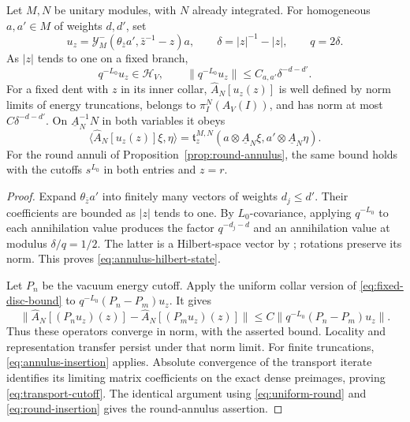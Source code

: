 \begin{lemma}\label{lem:transport-cutoff}
Let $M,N$ be unitary modules, with $N$ already integrated.  For
homogeneous $a,a'\in M$ of weights $d,d'$, set
\[
 u_z=\mathcal Y_M^-(\theta_{\bar z}a',\bar z^{-1}-z)a,
 \qquad \delta=|z|^{-1}-|z|,\qquad q=2\delta.
\]
As $|z|$ tends to one on a fixed branch,
\begin{equation}\label{eq:annulus-hilbert-state}
 q^{-L_0}u_z\in\mathcal H_V,
 \qquad \|q^{-L_0}u_z\|\leq C_{a,a'}\delta^{-d-d'}.
\end{equation}
For a fixed dent with $z$ in its inner collar,
$\widehat A_N[u_z(z)]$ is well defined by norm limits of energy
truncations, belongs to $\pi_I^N(A_V(I))$, and has norm at most
$C\delta^{-d-d'}$.  On $\underline A_N^{-1}N$ in both variables it obeys
\begin{equation}\label{eq:transport-cutoff}
 \langle\widehat A_N[u_z(z)]\xi,\eta\rangle
 =\mathfrak t_z^{M,N}
   (a\otimes\underline A_N\xi,
    a'\otimes\underline A_N\eta).
\end{equation}
For the round annuli of Proposition~\ref{prop:round-annulus}, the same
bound holds with the cutoffs $s^{L_0}$ in both entries and $z=r$.
\end{lemma}

\begin{proof}
Expand $\theta_{\bar z}a'$ into finitely many vectors of weights
$d_j\leq d'$.  Their coefficients are bounded as $|z|$ tends to one.
By $L_0$-covariance, applying $q^{-L_0}$ to each annihilation value
produces the factor $q^{-d_j-d}$ and an annihilation value at modulus
$\delta/q=1/2$.  The latter is a Hilbert-space vector by
\cite[Proposition~3.11]{TenerFusion}; rotations preserve its norm.
This proves \eqref{eq:annulus-hilbert-state}.

Let $P_n$ be the vacuum energy cutoff.  Apply the uniform collar
version of \eqref{eq:fixed-disc-bound} to
$q^{-L_0}(P_n-P_m)u_z$.  It gives
\[
 \|\widehat A_N[(P_n u_z)(z)]
       -\widehat A_N[(P_m u_z)(z)]\|
 \leq C\|q^{-L_0}(P_n-P_m)u_z\|.
\]
Thus these operators converge in norm, with the asserted bound.
Locality and representation transfer persist under that norm limit.
For finite truncations, \eqref{eq:annulus-insertion} applies.
Absolute convergence of the transport iterate identifies its limiting
matrix coefficients on the exact dense preimages, proving
\eqref{eq:transport-cutoff}.  The identical argument using
\eqref{eq:uniform-round} and \eqref{eq:round-insertion} gives the
round-annulus assertion.
\end{proof}

